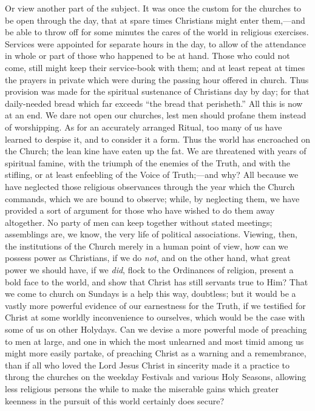 Or view another part of the subject. It was once the custom for the
churches to be open through the day, that at spare times Christians
might enter them,—and be able to throw off for some minutes the cares
of the world in religious exercises. Services were appointed for
separate hours in the day, to allow of the attendance in whole or part
of those who happened to be at hand. Those who could not come, still
might keep their service-book with them; and at least repeat at times
the prayers in private which were during the passing hour offered in
church. Thus provision was made for the spiritual sustenance of
Christians day by day; for that daily-needed bread which far exceeds
``the bread that perisheth.'' All this is now at an end. We dare
not open our churches, lest men should profane them instead of
worshipping. As for an accurately arranged Ritual, too many of us have
learned to despise it, and to consider it a form. Thus the world has
encroached on the Church; the lean kine have eaten up the fat. We are
threatened with years of spiritual famine, with the triumph of the
enemies of the Truth, and with the stifling, or at least enfeebling of
the Voice of Truth;—and why? All because we have neglected those
religious observances through the year which the Church commands, which
we are bound to observe; while, by neglecting them, we have provided a
sort of argument for those who have wished to do them away altogether.
No party of men can keep together without stated meetings; assemblings
are, we know, the very life of political associations. Viewing, then,
the institutions of the Church merely in a human point of view, how can
we possess power as Christians, if we do \emph{not}, and on the other
hand, what great power we should have, if we \emph{did}, flock to the
Ordinances of religion, present a bold face to the world, and show that
Christ has still servants true to Him? That we come to church on Sundays
is a help this way, doubtless; but it would be a vastly more powerful
evidence of our earnestness for the Truth, if we testified for Christ at
some worldly inconvenience to ourselves, which would be the case with
some of us on other Holydays. Can we devise a more powerful mode of
preaching to men at large, and one in which the most unlearned and most
timid among us might more easily partake, of preaching Christ as a
warning and a remembrance, than if all who loved the Lord Jesus Christ
in sincerity made it a practice to throng the churches on the weekday
Festivals and various Holy Seasons, allowing less religious persons the
while to make the miserable gains which greater keenness in the pursuit
of this world certainly does secure?

